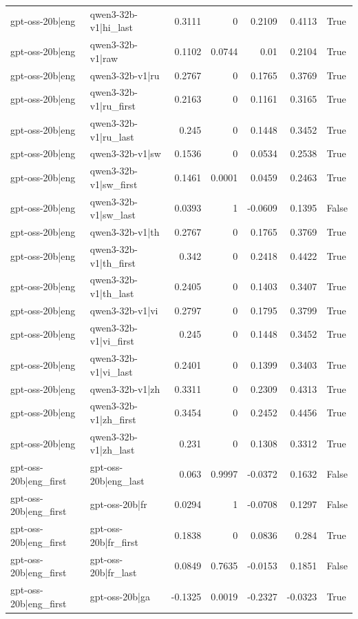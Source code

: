 \begin{table}
\begin{tabular}{l l r r r r l}
gpt-oss-20b|eng & qwen3-32b-v1|hi_last & 0.3111 & 0 & 0.2109 & 0.4113 & True \\
gpt-oss-20b|eng & qwen3-32b-v1|raw & 0.1102 & 0.0744 & 0.01 & 0.2104 & True \\
gpt-oss-20b|eng & qwen3-32b-v1|ru & 0.2767 & 0 & 0.1765 & 0.3769 & True \\
gpt-oss-20b|eng & qwen3-32b-v1|ru_first & 0.2163 & 0 & 0.1161 & 0.3165 & True \\
gpt-oss-20b|eng & qwen3-32b-v1|ru_last & 0.245 & 0 & 0.1448 & 0.3452 & True \\
gpt-oss-20b|eng & qwen3-32b-v1|sw & 0.1536 & 0 & 0.0534 & 0.2538 & True \\
gpt-oss-20b|eng & qwen3-32b-v1|sw_first & 0.1461 & 0.0001 & 0.0459 & 0.2463 & True \\
gpt-oss-20b|eng & qwen3-32b-v1|sw_last & 0.0393 & 1 & -0.0609 & 0.1395 & False \\
gpt-oss-20b|eng & qwen3-32b-v1|th & 0.2767 & 0 & 0.1765 & 0.3769 & True \\
gpt-oss-20b|eng & qwen3-32b-v1|th_first & 0.342 & 0 & 0.2418 & 0.4422 & True \\
gpt-oss-20b|eng & qwen3-32b-v1|th_last & 0.2405 & 0 & 0.1403 & 0.3407 & True \\
gpt-oss-20b|eng & qwen3-32b-v1|vi & 0.2797 & 0 & 0.1795 & 0.3799 & True \\
gpt-oss-20b|eng & qwen3-32b-v1|vi_first & 0.245 & 0 & 0.1448 & 0.3452 & True \\
gpt-oss-20b|eng & qwen3-32b-v1|vi_last & 0.2401 & 0 & 0.1399 & 0.3403 & True \\
gpt-oss-20b|eng & qwen3-32b-v1|zh & 0.3311 & 0 & 0.2309 & 0.4313 & True \\
gpt-oss-20b|eng & qwen3-32b-v1|zh_first & 0.3454 & 0 & 0.2452 & 0.4456 & True \\
gpt-oss-20b|eng & qwen3-32b-v1|zh_last & 0.231 & 0 & 0.1308 & 0.3312 & True \\
gpt-oss-20b|eng_first & gpt-oss-20b|eng_last & 0.063 & 0.9997 & -0.0372 & 0.1632 & False \\
gpt-oss-20b|eng_first & gpt-oss-20b|fr & 0.0294 & 1 & -0.0708 & 0.1297 & False \\
gpt-oss-20b|eng_first & gpt-oss-20b|fr_first & 0.1838 & 0 & 0.0836 & 0.284 & True \\
gpt-oss-20b|eng_first & gpt-oss-20b|fr_last & 0.0849 & 0.7635 & -0.0153 & 0.1851 & False \\
gpt-oss-20b|eng_first & gpt-oss-20b|ga & -0.1325 & 0.0019 & -0.2327 & -0.0323 & True \\

\end{tabular}
\end{table}
